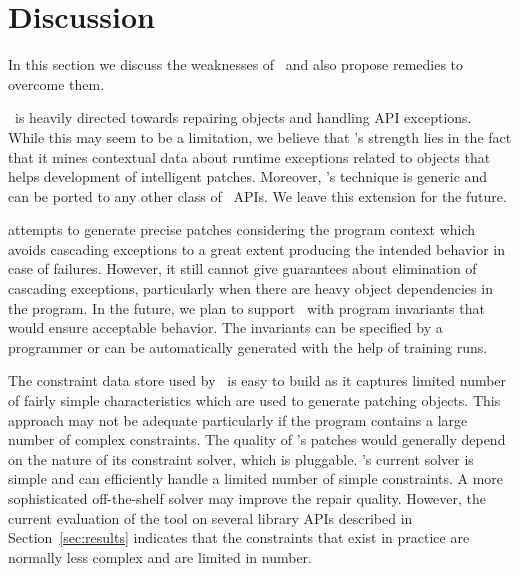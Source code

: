\section{Discussion}
\label{sec:discussion}

In this section we discuss the weaknesses of \tool\ and also propose
remedies to overcome them.

 \tool\ is heavily directed towards repairing 
  objects and handling API
exceptions. While this may seem to be a limitation, we believe that \tool's
strength lies in the fact that it mines contextual data about runtime exceptions
related to  objects that helps development of intelligent patches.
Moreover, \tool's technique is generic and can be ported to any other class of
\java\ APIs. We leave this extension for the future.

 \tool attempts to
generate precise patches considering the program context which avoids
cascading exceptions to a great extent producing the intended behavior in case
of failures. However, it still cannot give guarantees about elimination of cascading
exceptions, particularly when there are heavy object dependencies in the program.
In the future, we plan to support \tool\ with program invariants that would ensure 
acceptable behavior. The invariants can be specified by a programmer or can be
automatically generated with the help of training runs.

 The constraint data store used by
\tool\ is easy to build as it captures
limited number of fairly simple  characteristics which are used to
generate patching  objects. This approach may not be adequate particularly
if the program contains a large number of complex constraints. The quality of
\tool's patches would generally depend on the nature of its constraint solver,
which is pluggable. \tool's current solver is simple and can efficiently
handle a limited number of simple constraints. A more sophisticated off-the-shelf solver may improve
the repair quality. However, the current evaluation of the tool
on several library APIs described in Section~\ref{sec:results} indicates that the constraints that exist
in practice are normally less complex and are limited in number. 


